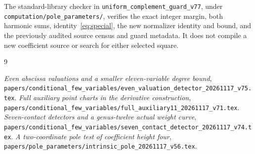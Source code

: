\documentclass[11pt,a4paper]{article}
\begin{document}
The standard-library checker in \texttt{uniform\_complement\_guard\_v77},
under \nolinkurl{computation/pole_parameters/}, verifies the exact integer
margin, both harmonic sums, identity~\eqref{eq:special}, the new
normalizer identity and bound, and the previously audited source census
and guard metadata. It does not compile a new coefficient source or
search for either selected square.

\begin{thebibliography}{9}\raggedright
{}\emph{Even abscissa valuations and a smaller eleven-variable degree bound},
\nolinkurl{papers/conditional_few_variables/even_valuation_detector_20261117_v75.tex}.
\emph{Full auxiliary point charts in the derivative construction},
\nolinkurl{papers/conditional_few_variables/full_auxiliary11_20261117_v71.tex}.
\emph{Seven-contact detectors and a genus-twelve actual weight curve},
\nolinkurl{papers/conditional_few_variables/seven_contact_detector_20261117_v74.tex}.
\emph{A two-coordinate pole test of coefficient height four},
\nolinkurl{papers/pole_parameters/intrinsic_pole_20261117_v56.tex}.
\end{thebibliography}
\end{document}
